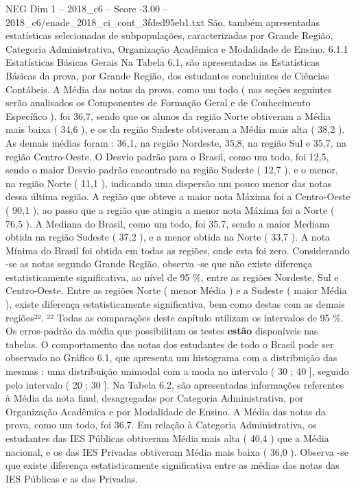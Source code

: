 \begin{textsample}{NEG Dim 1 – 2018\_c6 – Score -3.00 – 2018\_c6/enade\_2018\_ci\_cont\_3fded95eb1.txt}
São, também apresentadas estatísticas selecionadas de subpopulações, caracterizadas por Grande Região, Categoria Administrativa, Organização Acadêmica e Modalidade de Ensino. 6.1.1 Estatísticas Básicas Gerais Na Tabela 6.1, são apresentadas as Estatísticas Básicas da prova, por Grande Região, dos estudantes concluintes de Ciências Contábeis.
A Média das notas da prova, como um todo ( nas seções seguintes serão analisados os Componentes de Formação Geral e de Conhecimento Específico ), foi 36,7, sendo que os alunos da região Norte obtiveram a Média mais baixa ( 34,6 ), e os da região Sudeste obtiveram a Média mais alta ( 38,2 ).
As demais médias foram : 36,1, na região Nordeste, 35,8, na região Sul e 35,7, na região Centro-Oeste.
O Desvio padrão para o Brasil, como um todo, foi 12,5, sendo o maior Desvio padrão encontrado na região Sudeste ( 12,7 ), e o menor, na região Norte ( 11,1 ), indicando uma dispersão um pouco menor das notas dessa última região.
A região que obteve a maior nota Máxima foi a Centro-Oeste ( 90,1 ), ao passo que a região que atingiu a menor nota Máxima foi a Norte ( 76,5 ).
A Mediana do Brasil, como um todo, foi 35,7, sendo a maior Mediana obtida na região Sudeste ( 37,2 ), e a menor obtida na Norte ( 33,7 ).
A nota Mínima do Brasil foi obtida em todas as regiões, onde esta foi zero.
Considerando -se as notas segundo Grande Região, observa -se que não existe diferença estatisticamente significativa, ao nível de 95 \%, entre as regiões Nordeste, Sul e Centro-Oeste.
Entre as regiões Norte ( menor Média ) e a Sudeste ( maior Média ), existe diferença estatisticamente significativa, bem como destas com as demais regiões²². ²² Todas as comparações deste capítulo utilizam os intervalos de 95 \%.
Os erros-padrão da média que possibilitam os testes \textbf{estão} disponíveis nas tabelas.
O comportamento das notas dos estudantes de todo o Brasil pode ser observado no Gráfico 6.1, que apresenta um histograma com a distribuição das mesmas : uma distribuição unimodal com a moda no intervalo ( 30 ; 40 ], seguido pelo intervalo ( 20 ; 30 ].
Na Tabela 6.2, são apresentadas informações referentes à Média da nota final, desagregadas por Categoria Administrativa, por Organização Acadêmica e por Modalidade de Ensino.
A Média das notas da prova, como um todo, foi 36,7.
Em relação à Categoria Administrativa, os estudantes das IES Públicas obtiveram Média mais alta ( 40,4 ) que a Média nacional, e os das IES Privadas obtiveram Média mais baixa ( 36,0 ).
Observa -se que existe diferença estatisticamente significativa entre as médias das notas das IES Públicas e as das Privadas.

\end{textsample}
